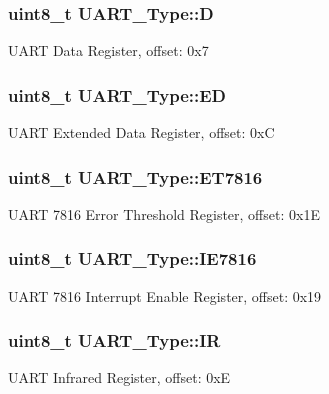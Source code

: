 \subsubsection[{\texorpdfstring{D}{D}}]{ uint8\+\_\+t U\+A\+R\+T\+\_\+\+Type\+::D}\hypertarget{structUART__Type_af5e2df4671867807c472469a394c0619}{}\label{structUART__Type_af5e2df4671867807c472469a394c0619}
U\+A\+RT Data Register, offset\+: 0x7 
\subsubsection[{\texorpdfstring{ED}{ED}}]{ uint8\+\_\+t U\+A\+R\+T\+\_\+\+Type\+::\+ED}\hypertarget{structUART__Type_a7d4dbb62f5f502e4e6190f7574d6e372}{}\label{structUART__Type_a7d4dbb62f5f502e4e6190f7574d6e372}
U\+A\+RT Extended Data Register, offset\+: 0xC 
\subsubsection[{\texorpdfstring{E\+T7816}{ET7816}}]{ uint8\+\_\+t U\+A\+R\+T\+\_\+\+Type\+::\+E\+T7816}\hypertarget{structUART__Type_adb5e3ab142d426d631595daaf8e5220e}{}\label{structUART__Type_adb5e3ab142d426d631595daaf8e5220e}
U\+A\+RT 7816 Error Threshold Register, offset\+: 0x1E 
\subsubsection[{\texorpdfstring{I\+E7816}{IE7816}}]{ uint8\+\_\+t U\+A\+R\+T\+\_\+\+Type\+::\+I\+E7816}\hypertarget{structUART__Type_a970303bbe82348655affe06e79e8f6e3}{}\label{structUART__Type_a970303bbe82348655affe06e79e8f6e3}
U\+A\+RT 7816 Interrupt Enable Register, offset\+: 0x19 
\subsubsection[{\texorpdfstring{IR}{IR}}]{ uint8\+\_\+t U\+A\+R\+T\+\_\+\+Type\+::\+IR}\hypertarget{structUART__Type_ad836545a70769f43817e1cc2b4e1af00}{}\label{structUART__Type_ad836545a70769f43817e1cc2b4e1af00}
U\+A\+RT Infrared Register, offset\+: 0xE 
